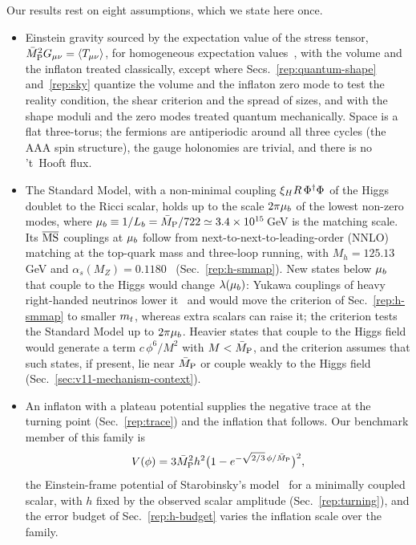 Our results rest on eight assumptions, which we state here once.
\begin{itemize}
\item[(A1)]
Einstein gravity sourced by the expectation value of the stress tensor, $\bar M_{\mathrm{P}}^2G_{\mu\nu}=\langle T_{\mu\nu}\rangle$, for homogeneous expectation values~\cite{Hartle:1981zt}, with the volume and the inflaton treated classically, except where Secs.~\ref{rep:quantum-shape} and~\ref{rep:sky} quantize the volume and the inflaton zero mode to test the reality condition, the shear criterion and the spread of sizes, and with the shape moduli and the zero modes treated quantum mechanically.
Space is a flat three-torus; the fermions are antiperiodic around all three cycles (the AAA spin structure), the gauge holonomies are trivial, and there is no 't~Hooft flux.
\item[(A2)]
The Standard Model, with a non-minimal coupling $\xi_H R\,\Phi^\dagger\Phi$ of the Higgs doublet to the Ricci scalar, holds up to the scale $2\pi\mu_b$ of the lowest non-zero modes, where $\mu_b\equiv1/L_b=\bar M_{\mathrm{P}}/722\simeq3.4\times10^{15}$\,GeV is the matching scale. %
Its $\overline{\mathrm{MS}}$ couplings at $\mu_b$ follow from next-to-next-to-leading-order (NNLO) matching at the top-quark mass and three-loop running, with $M_h=125.13$\,GeV and $\alpha_s(M_Z)=0.1180$~\cite{ParticleDataGroup:2026mpi} (Sec.~\ref{rep:h-smmap}). %
New states below $\mu_b$ that couple to the Higgs would change $\lambda(\mu_b)$: Yukawa couplings of heavy right-handed neutrinos lower it~\cite{Casas:1999cd,Rodejohann:2012px} and would move the criterion of Sec.~\ref{rep:h-smmap} to smaller $m_t$, whereas extra scalars can raise it; the criterion tests the Standard Model up to $2\pi\mu_b$.
Heavier states that couple to the Higgs field would generate a term $c\,\phi^6/M^2$ with $M<\bar M_{\mathrm{P}}$, and the criterion assumes that such states, if present, lie near $\bar M_{\mathrm{P}}$ or couple weakly to the Higgs field (Sec.~\ref{sec:v11-mechanism-context}).
\item[(A3)]
An inflaton with a plateau potential supplies the negative trace at the turning point (Sec.~\ref{rep:trace}) and the inflation that follows.
Our benchmark member of this family is
\begin{equation}
V(\phi)=3\bar M_{\mathrm{P}}^2h^2\big(1-e^{-\sqrt{2/3}\,\phi/\bar M_{\mathrm{P}}}\big)^2,
\label{eq:rA-plateau}
\end{equation}
the Einstein-frame potential of Starobinsky's model~\cite{Starobinsky:1980te} for a minimally coupled scalar, with $h$ fixed by the observed scalar amplitude (Sec.~\ref{rep:turning}), and the error budget of Sec.~\ref{rep:h-budget} varies the inflation scale over the family.

\end{itemize}
